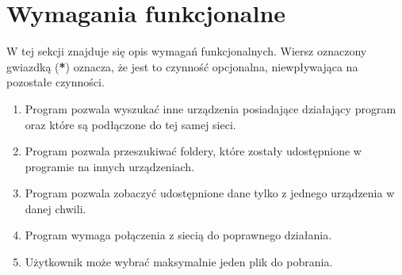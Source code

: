 \documentclass[12pt,a4paper]{article}
\begin{document}
\section{Wymagania funkcjonalne}
W tej sekcji znajduje się opis wymagań funkcjonalnych. Wiersz oznaczony gwiazdką (\textbf{*}) oznacza, że jest to czynność opcjonalna, niewpływająca na pozostałe czynności.

\begin{enumerate}
	\item Program pozwala wyszukać inne urządzenia posiadające działający program oraz które są podłączone do tej samej sieci.
	\item Program pozwala przeszukiwać foldery, które zostały udostępnione w programie na innych urządzeniach.
	\item Program pozwala zobaczyć udostępnione dane tylko z jednego urządzenia w danej chwili.
	\item Program wymaga połączenia z siecią do poprawnego działania.
	\item Użytkownik może wybrać maksymalnie jeden plik do pobrania.
\end{enumerate}
\end{document}
